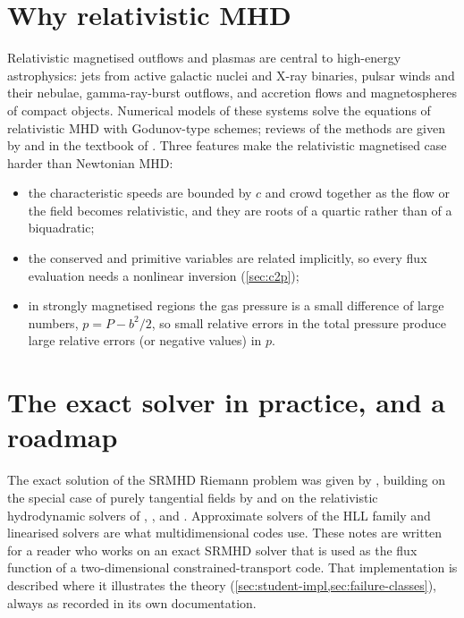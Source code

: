 \documentclass[11pt,a4paper,oneside,openany]{book}
\newcommand{\textcite}{\citet}
\newcommand{\parencite}{\citep}
\theoremstyle{definition}
\theoremstyle{plain}
\theoremstyle{remark}
\newcommand{\Ptot}{P}
\begin{document}
\section{Why relativistic MHD}

Relativistic magnetised outflows and plasmas are central to high-energy astrophysics:
jets from active galactic nuclei and X-ray binaries, pulsar winds and their nebulae,
gamma-ray-burst outflows, and accretion flows and magnetospheres of compact objects.
Numerical models of these systems solve the equations of relativistic MHD with
Godunov-type schemes; reviews of the methods are given by \textcite{MartiMuller2015} and
in the textbook of \textcite{RezzollaZanotti2013}. Three features make the relativistic
magnetised case harder than Newtonian MHD:
\begin{itemize}[nosep]
\item the characteristic speeds are bounded by $c$ and crowd together as the flow or the
  field becomes relativistic, and they are roots of a quartic rather than of a
  biquadratic;
\item the conserved and primitive variables are related implicitly, so every flux
  evaluation needs a nonlinear inversion (\cref{sec:c2p});
\item in strongly magnetised regions the gas pressure is a small difference of large
  numbers, $p=\Ptot-b^2/2$, so small relative errors in the total pressure produce
  large relative errors (or negative values) in $p$.
\end{itemize}

\section{The exact solver in practice, and a roadmap}

The exact solution of the SRMHD Riemann problem was given by
\textcite{GiacomazzoRezzolla2006}, building on the special case of purely tangential
fields by \textcite{Romero2005} and on the relativistic hydrodynamic solvers of
\textcite{MartiMuller1994}, \textcite{Pons2000}, \textcite{RezzollaZanotti2001} and
\textcite{RezzollaZanottiPons2003}. Approximate solvers of the HLL family
\parencite{MignoneBodo2006,MignoneUglianoBodo2009} and linearised solvers
\parencite{Komissarov1999,Balsara2001,Anton2010} are what multidimensional codes use.
These notes are written for a reader who works on an exact SRMHD solver that is used as
the flux function of a two-dimensional constrained-transport code. That implementation
is described where it illustrates the theory (\cref{sec:student-impl,sec:failure-classes}),
always as recorded in its own documentation.
\end{document}
